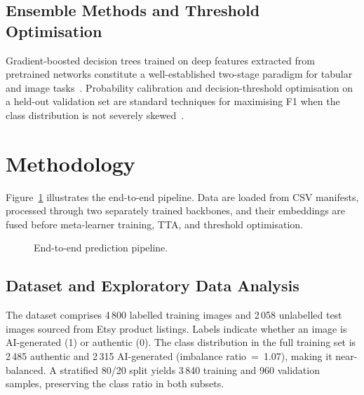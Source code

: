 \documentclass[conference]{IEEEtran}
\begin{document}
\subsection{Ensemble Methods and Threshold Optimisation}

Gradient-boosted decision trees trained on deep features extracted from
pretrained networks constitute a well-established two-stage paradigm for
tabular and image tasks~\cite{chen2016xgboost,prokhorenkova2018catboost}.
Probability calibration and decision-threshold optimisation on a held-out
validation set are standard techniques for maximising F1 when the class
distribution is not severely skewed~\cite{provost2000wellbehaved}.

\section{Methodology}
\label{sec:method}

Figure~\ref{fig:pipeline} illustrates the end-to-end pipeline.  Data are loaded
from CSV manifests, processed through two separately trained backbones, and their
embeddings are fused before meta-learner training, TTA, and threshold optimisation.

\begin{figure}[t]
  \centering
  \caption{End-to-end prediction pipeline.}
  \label{fig:pipeline}
\end{figure}

\subsection{Dataset and Exploratory Data Analysis}

The dataset comprises 4\,800 labelled training images and 2\,058 unlabelled test
images sourced from Etsy product listings.  Labels indicate whether an image is
AI-generated (1) or authentic (0).  The class distribution in the full training
set is 2\,485 authentic and 2\,315 AI-generated (imbalance ratio~=~1.07),
making it near-balanced.  A stratified 80/20 split yields 3\,840 training and
960 validation samples, preserving the class ratio in both subsets.
\end{document}
